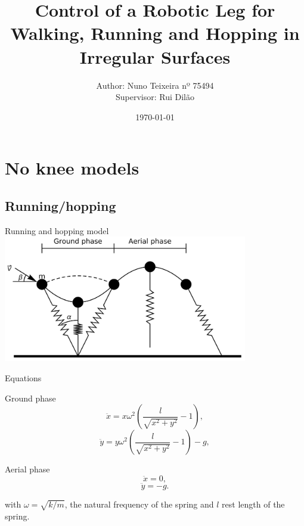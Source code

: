 \documentclass{beamer}
\title[PMEFT]{Control of a Robotic Leg for Walking, Running and Hopping in Irregular Surfaces}
\author{Author: Nuno Teixeira nº 75494 \\ Supervisor: Rui Dilão}
\institute{Projecto MEFT \\Instituto Superior Técnico}
\date{\today}
\begin{document}
\begin{frame}
  \titlepage
\end{frame}

\section{No knee models}
\subsection{Running/hopping}
\centering
\begin{frame}{Running and hopping model}
  \centering
\includegraphics[width=0.8\textwidth]{Blickhan_model.png}
\end{frame}

\begin{frame}{Equations}
  \begin{block}{Ground phase}
  \begin{equation}
  \ddot{x}=x\omega^2\left(\frac{l}{\sqrt{x^2+y^2}}-1\right),
\end{equation}
\begin{equation}
  \ddot{y}=y\omega^2\left(\frac{l}{\sqrt{x^2+y^2}}-1\right)-g,
\end{equation}
\end{block}

\begin{block}{Aerial phase}
\begin{equation}
  \ddot{x}=0,
\end{equation}
\begin{equation}
  \ddot{y}=-g.
  \end{equation}
\end{block}
with $\omega=\sqrt{k/m}$, the natural frequency of the spring and $l$ rest length of the spring. 
\end{frame}
\end{document}

